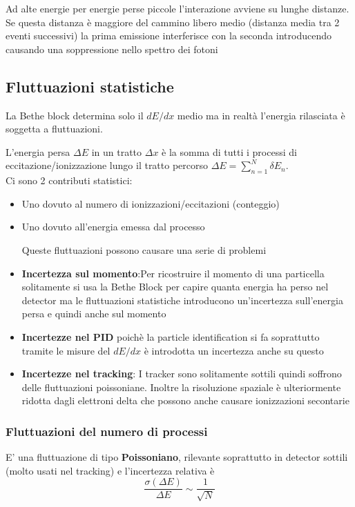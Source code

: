   Ad alte energie per energie perse piccole l'interazione avviene su lunghe distanze. Se questa distanza è maggiore del cammino libero medio (distanza media tra 2 eventi successivi) la prima emissione interferisce con la seconda introducendo causando una soppressione nello spettro dei fotoni
\subsection{Fluttuazioni statistiche}
La Bethe block determina solo il $dE/dx$ medio ma in realtà l'energia rilasciata è soggetta a fluttuazioni.

L'energia persa $\Delta E$ in un tratto $\Delta x$ è la somma di tutti i processi di eccitazione/ionizzazione lungo il tratto percorso $\Delta E= \sum^N_{n=1} \delta E_n$.\\
Ci sono 2 contributi statistici:
\begin{itemize}
    \item Uno dovuto al numero di ionizzazioni/eccitazioni (conteggio)
    \item Uno dovuto all'energia emessa dal processo

    Queste fluttuazioni possono causare una serie di problemi

    \item \textbf{Incertezza sul momento}:Per ricostruire il momento di una particella solitamente si usa la Bethe Block per capire quanta energia ha perso nel detector ma le fluttuazioni statistiche introducono un'incertezza sull'energia persa e quindi anche sul momento
    \item \textbf{Incertezze nel PID} poichè la particle identification si fa soprattutto tramite le misure del $dE/dx$ è introdotta un incertezza anche su questo
    \item \textbf{Incertezze nel tracking}: I tracker sono solitamente sottili quindi soffrono delle fluttuazioni poissoniane. Inoltre la risoluzione spaziale è ulteriormente ridotta dagli elettroni delta che possono anche causare ionizzazioni secontarie

\end{itemize}

\subsubsection*{Fluttuazioni del numero di processi}
E' una fluttuazione di tipo \textbf{Poissoniano}, rilevante soprattutto in detector sottili (molto usati nel tracking) e l'incertezza relativa è
\[\frac{\sigma(\Delta E)}{\Delta E}\sim\frac{1}{\sqrt{N}}\]


